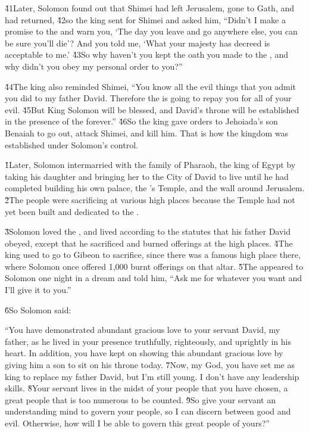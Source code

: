 \v{41}Later, Solomon found out that Shimei had left Jerusalem, gone to Gath, and had returned, \v{42}so the king sent for Shimei and asked him, ``Didn't I make a promise to the  and warn you, `The day you leave and go anywhere else, you can be sure you'll die'? And you told me, `What your majesty has decreed is acceptable to me.' \v{43}So why haven't you kept the oath you made to the , and why didn't you obey my personal order to you?''

\v{44}The king also reminded Shimei, ``You know all the evil things that you admit you did to my father David. Therefore the  is going to repay you for all of your evil. \v{45}But King Solomon will be blessed, and David's throne will be established in the presence of the  forever.'' \v{46}So the king gave orders to Jehoiada's son Benaiah to go out, attack Shimei, and kill him. That is how the kingdom was established under Solomon's control.

\v{1}Later, Solomon intermarried with the family of Pharaoh, the king of Egypt by taking his daughter and bringing her to the City of David to live until he had completed building his own palace, the 's Temple, and the wall around Jerusalem. \v{2}The people were sacrificing at various high places because the Temple had not yet been built and dedicated to the .

\v{3}Solomon loved the , and lived according to the statutes that his father David obeyed, except that he sacrificed and burned offerings at the high places. \v{4}The king used to go to Gibeon to sacrifice, since there was a famous high place there, where Solomon once offered 1,000 burnt offerings on that altar. \v{5}The  appeared to Solomon one night in a dream and told him, ``Ask me for whatever you want and I'll give it to you.''

\v{6}So Solomon said:

\begin{poetry}
\poeml ``You have demonstrated abundant gracious love to your servant David, my father, as he lived in your presence truthfully, righteously, and uprightly in his heart. In addition, you have kept on showing this abundant gracious love by giving him a son to sit on his throne today. \v{7}Now,  my God, you have set me as king to replace my father David, but I'm still young. I don't have any leadership skills. \v{8}Your servant lives in the midst of your people that you have chosen, a great people that is too numerous to be counted. \v{9}So give your servant an understanding mind to govern your people, so I can discern between good and evil. Otherwise, how will I be able to govern this great people of yours?''
\end{poetry}

